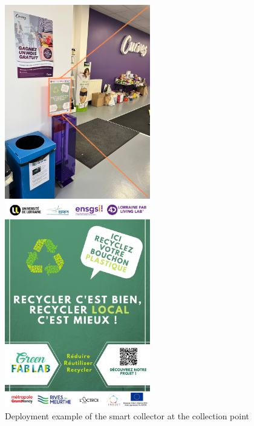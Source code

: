 \documentclass[
  11pt,
]{article}
\begin{document}
\begin{figure}

\begin{minipage}[b]{0.50\linewidth}

{\centering 

\includegraphics[width=2.5in,height=\textheight]{figures/SC/curves-00.jpeg}

}

\end{minipage}%
%
\begin{minipage}[b]{0.50\linewidth}

{\centering 

\includegraphics[width=2.5in,height=\textheight]{figures/SC/comm.jpg}

}

\end{minipage}%

\caption{\label{fig-smart}Deployment example of the smart collector at
the collection point}

\end{figure}
\end{document}
